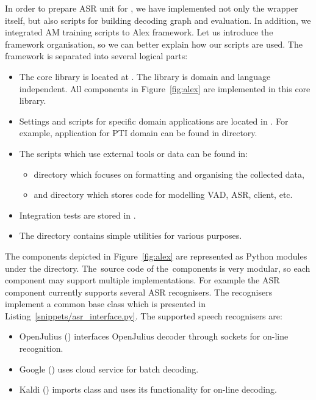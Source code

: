 In order to prepare \ac{ASR} unit for , we have implemented not only the wrapper itself, but also scripts for building decoding graph and evaluation.
In addition, we integrated \ac{AM} training scripts to Alex framework.
Let us introduce the framework organisation, so we can better explain how our scripts are used.
The framework is separated into several logical parts:
\begin{itemize}
    \item The core library is located at . The library is domain and language independent. All components in Figure~\ref{fig:alex} are implemented in this core library.
    \item Settings and scripts for specific domain applications are located in .
        For example, application for \ac{PTI} domain can be found in  directory.
    \item The scripts which use external tools or data can be found in:
        \begin{itemize}
            \item {} directory which focuses on formatting and organising the collected data,
            \item and \term {} directory which stores code for modelling \ac{VAD}, \ac{ASR},  client, etc.
        \end{itemize}
    \item Integration tests are stored in .
    \item The  directory contains simple utilities for various purposes.
\end{itemize}

The components depicted in Figure~\ref{fig:alex} are represented as Python modules under the  directory.
The~source code of the~components is very modular, so each component may support multiple implementations.
For example the \ac{ASR} component currently supports several \ac{ASR} recognisers.
The recognisers implement a common base class  which is presented in Listing~\ref{snippets/asr_interface.py}.
The supported speech recognisers are:
\begin{itemize}
    \item OpenJulius () interfaces OpenJulius decoder through sockets for on-line recognition.
    \item Google () uses cloud service for batch decoding.
    \item Kaldi () imports  class and uses its functionality for on-line decoding.
\end{itemize}

